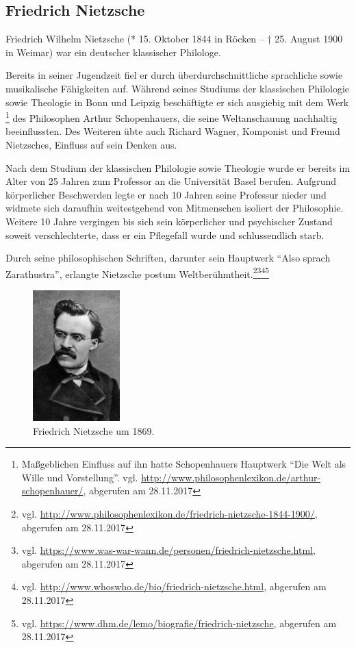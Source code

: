 \subsection{Friedrich Nietzsche}
Friedrich Wilhelm Nietzsche (* 15. Oktober 1844 in Röcken – † 25. August 1900 in Weimar) war ein deutscher klassischer Philologe.

Bereits in seiner Jugendzeit fiel er durch überdurchschnittliche sprachliche sowie musikalische Fähigkeiten auf.
Während seines Studiums der klassischen Philologie sowie Theologie in Bonn und Leipzig beschäftigte er sich ausgiebig mit dem Werk
\footnote{Maßgeblichen Einfluss auf ihn hatte Schopenhauers Hauptwerk \enquote{Die Welt als Wille und Vorstellung}. vgl. \url{http://www.philosophenlexikon.de/arthur-schopenhauer/}, abgerufen am 28.11.2017}
des Philosophen Arthur Schopenhauers, die seine Weltanschauung nachhaltig beeinflussten.
Des Weiteren übte auch Richard Wagner, Komponist und Freund Nietzsches, Einfluss auf sein Denken aus.

Nach dem Studium der klassischen Philologie sowie Theologie wurde er bereits im Alter von 25 Jahren zum Professor an die Universität Basel berufen.
Aufgrund körperlicher Beschwerden legte er nach 10 Jahren seine Professur nieder und widmete sich daraufhin weitestgehend von Mitmenschen isoliert der Philosophie.
Weitere 10 Jahre vergingen bis sich sein körperlicher und psychischer Zustand soweit verschlechterte, dass er ein Pflegefall wurde und schlussendlich starb.

Durch seine philosophischen Schriften, darunter sein Hauptwerk \enquote{Also sprach Zarathustra}, erlangte Nietzsche postum Weltberühmtheit.\footnote{vgl. \url{http://www.philosophenlexikon.de/friedrich-nietzsche-1844-1900/}, abgerufen am 28.11.2017}\footnote{vgl. \url{https://www.was-war-wann.de/personen/friedrich-nietzsche.html}, abgerufen am 28.11.2017}\footnote{vgl. \url{http://www.whoswho.de/bio/friedrich-nietzsche.html}, abgerufen am 28.11.2017}\footnote{vgl. \url{https://www.dhm.de/lemo/biografie/friedrich-nietzsche}, abgerufen am 28.11.2017}

\begin{figure}[H]
\centering 
 \includegraphics[width=0.3\textwidth]{Bilder/kap3/nietzschePortrait} 
 \caption{Friedrich Nietzsche um 1869.\cite{WQ14}  \label{portraitNietzsche}}
\end{figure}

